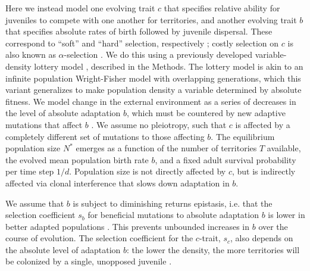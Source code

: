 \documentclass[9pt,twocolumn,twoside,lineno]{gsajnl}
\begin{document}
Here we instead model one evolving trait $c$ that specifies relative ability for juveniles to compete with one another for territories, and another evolving trait $b$ that specifies absolute rates of birth followed by juvenile dispersal. These correspond to ``soft'' and ``hard'' selection, respectively \citep{Wallace1975, Reznick2015, Belletal2021, Travis2023}; costly selection on $c$ is also known as $\alpha$-selection \citep{Joshi2001,Gill1974}. We do this using a previously developed variable-density lottery model \citep{bertram2019density}, described in the Methods. The lottery model \citep{ChessonWarner1981} is akin to an infinite population Wright-Fisher model with overlapping generations, which this variant generalizes to make population density a variable determined by absolute fitness. We model change in the external environment as a series of decreases in the level of absolute adaptation $b$, which must be countered by new adaptive mutations that affect $b$ \citep{bertram2017predicting}. We assume no pleiotropy, such that $c$ is affected by a completely different set of mutations to those affecting $b$. The equilibrium population size $N^*$ emerges as a function of the number of territories $T$ available, the evolved mean population birth rate $b$, and a fixed adult survival probability per time step $1/d$. Population size is not directly affected by $c$, but is indirectly affected via clonal interference that slows down adaptation in $b$. 

We assume that $b$ is subject to diminishing returns epistasis, i.e. that the selection coefficient $s_b$ for beneficial mutations to absolute adaptation $b$ is lower in better adapted populations \citep{Kryazhimskiy2014globalEpistasis,Chou2011diminishingReturns,Khan2011negativeEpistasis,Wiseretal2013}. This prevents unbounded increases in $b$ over the course of evolution.
The selection coefficient for the $c$-trait, $s_c$, also depends on the absolute level of adaptation $b$: the lower the density, the more territories will be colonized by a single, unopposed juvenile \citep{bertram2019density,Both2003}.
\end{document}
